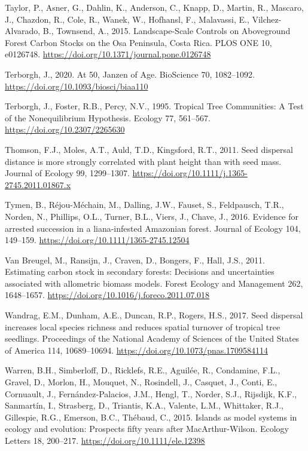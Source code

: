 \documentclass[
  12pt,
]{article}
\newlength{\cslhangindent}
\newlength{\cslentryspacingunit} %
\newenvironment{CSLReferences}[2] %
 {%
  \setlength{\parindent}{0pt}
  \ifodd #1
  \let\oldpar\par
  \def\par{\hangindent=\cslhangindent\oldpar}
  \fi
  \setlength{\parskip}{#2\cslentryspacingunit}
 }%
 {}
\begin{document}
\begin{CSLReferences}{1}{0}
\leavevmode{}%
Taylor, P., Asner, G., Dahlin, K., Anderson, C., Knapp, D., Martin, R., Mascaro, J., Chazdon, R., Cole, R., Wanek, W., Hofhansl, F., Malavassi, E., Vilchez-Alvarado, B., Townsend, A., 2015. Landscape-{Scale Controls} on {Aboveground Forest Carbon Stocks} on the {Osa Peninsula}, {Costa Rica}. PLOS ONE 10, e0126748. \url{https://doi.org/10.1371/journal.pone.0126748}

\leavevmode{}%
Terborgh, J., 2020. At 50, {Janzen} of {Age}. BioScience 70, 1082--1092. \url{https://doi.org/10.1093/biosci/biaa110}

\leavevmode{}%
Terborgh, J., Foster, R.B., Percy, N.V., 1995. Tropical {Tree Communities}: {A Test} of the {Nonequilibrium Hypothesis}. Ecology 77, 561--567. \url{https://doi.org/10.2307/2265630}

\leavevmode{}%
Thomson, F.J., Moles, A.T., Auld, T.D., Kingsford, R.T., 2011. Seed dispersal distance is more strongly correlated with plant height than with seed mass. Journal of Ecology 99, 1299--1307. \url{https://doi.org/10.1111/j.1365-2745.2011.01867.x}

\leavevmode{}%
Tymen, B., Réjou-Méchain, M., Dalling, J.W., Fauset, S., Feldpausch, T.R., Norden, N., Phillips, O.L., Turner, B.L., Viers, J., Chave, J., 2016. Evidence for arrested succession in a liana-infested {Amazonian} forest. Journal of Ecology 104, 149--159. \url{https://doi.org/10.1111/1365-2745.12504}

\leavevmode{}%
Van Breugel, M., Ransijn, J., Craven, D., Bongers, F., Hall, J.S., 2011. Estimating carbon stock in secondary forests: {Decisions} and uncertainties associated with allometric biomass models. Forest Ecology and Management 262, 1648--1657. \url{https://doi.org/10.1016/j.foreco.2011.07.018}

\leavevmode{}%
Wandrag, E.M., Dunham, A.E., Duncan, R.P., Rogers, H.S., 2017. Seed dispersal increases local species richness and reduces spatial turnover of tropical tree seedlings. Proceedings of the National Academy of Sciences of the United States of America 114, 10689--10694. \url{https://doi.org/10.1073/pnas.1709584114}

\leavevmode{}%
Warren, B.H., Simberloff, D., Ricklefs, R.E., Aguilée, R., Condamine, F.L., Gravel, D., Morlon, H., Mouquet, N., Rosindell, J., Casquet, J., Conti, E., Cornuault, J., Fernández-Palacios, J.M., Hengl, T., Norder, S.J., Rijsdijk, K.F., Sanmartín, I., Strasberg, D., Triantis, K.A., Valente, L.M., Whittaker, R.J., Gillespie, R.G., Emerson, B.C., Thébaud, C., 2015. Islands as model systems in ecology and evolution: Prospects fifty years after {MacArthur-Wilson}. Ecology Letters 18, 200--217. \url{https://doi.org/10.1111/ele.12398}


\end{CSLReferences}
\end{document}
